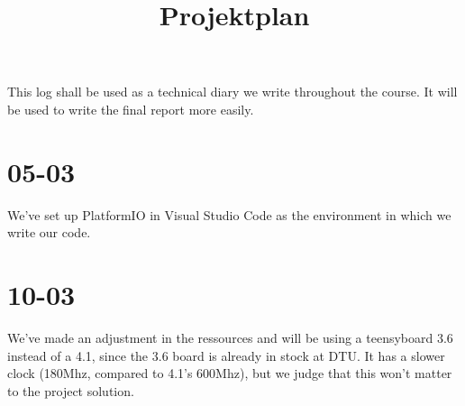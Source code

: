 \documentclass[]{article}
\title{Projektplan}
\begin{document}
This log shall be used as a technical diary we write throughout the course. It will be used to write the final report more easily.

\section{05-03}
We've set up PlatformIO in Visual Studio Code as the environment in which we write our code.

\section{10-03}
We've made an adjustment in the ressources and will be using a teensyboard 3.6 instead of a 4.1, since the 3.6 board is already in stock at DTU. It has a slower clock (180Mhz, compared to 4.1's 600Mhz), but we judge that this won't matter to the project solution.
\end{document}
